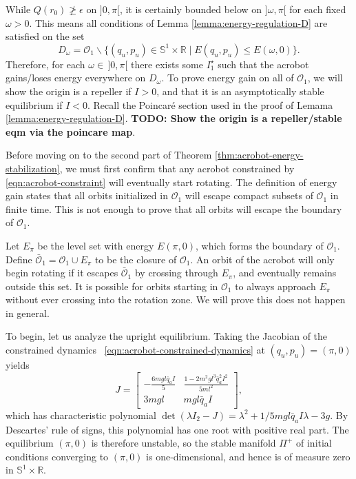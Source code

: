 \documentclass[journal,twoside,web]{ieeecolor}
\newcommand*{\R}{\mathbb{R}}
\newcommand*{\Sone}{\mathbb{S}^1}
\newcommand*{\SxR}{\Sone \times \R}
\newcommand*{\Id}[1]{I_{#1}}
\begin{document}
{While \(Q(r_0) \not \geq \epsilon\) on \(]0,\pi[\), it is certainly bounded
below on \(]\omega,\pi[\) for each fixed \(\omega > 0\).
This means all conditions of Lemma \ref{lemma:energy-regulation-D}
are satisfied on the set 
\[
    D_\omega = \mathcal{O}_1 \backslash 
    \{(q_u,p_u) \in \SxR \mid E(q_u,p_u) \leq E(\omega,0)\}
    .
\]
Therefore, for each \(\omega \in \, ]0,\pi[\) there exists some \(I_1^\star\)
such that the acrobot gains/loses energy everywhere on \(D_\omega\).
To prove energy gain on all of \(\mathcal{O}_1\), we will show the origin is a
repeller if \(I > 0\), and that it is an asymptotically stable equilibrium
if \(I < 0\).
Recall the Poincar\'{e} section used in the proof of Lemama
\ref{lemma:energy-regulation-D}.
\textbf{TODO: Show the origin is a repeller/stable eqm via the poincare map}.

Before moving on to the second part of Theorem
\ref{thm:acrobot-energy-stabilization}, we must first confirm that any acrobot
constrained by \eqref{eqn:acrobot-constraint} will eventually start rotating.
The definition of energy gain states that all orbits initialized in
\(\mathcal{O}_1\) will escape compact subsets of \(\mathcal{O}_1\) in finite time. 
This is not enough to prove that all orbits will escape the boundary of
\(\mathcal{O}_1\). 

Let \(E_\pi\) be the level set with energy \(E(\pi,0)\), 
which forms the boundary of \(\mathcal{O}_1\). 
Define \(\bar{\mathcal{O}}_1 = \mathcal{O}_1 \cup E_\pi\) to be the closure of
\(\mathcal{O}_1\).
An orbit of the acrobot will only begin rotating if it escapes
\(\bar{\mathcal{O}}_1\) by crossing through \(E_\pi\), and eventually remains
outside this set.
It is possible for orbits starting in \(\mathcal{O}_1\) to always approach
\(E_\pi\) without ever crossing into the rotation zone.
We will prove this does not happen in general.

To begin, let us analyze the upright equilibrium.
Taking the Jacobian of the constrained dynamics
~\eqref{eqn:acrobot-constrained-dynamics} at \((q_u,p_u) = (\pi,0)\) yields
\[
    J = \begin{bmatrix}
        -\frac{6mgl\bar{q}_aI}{5} & \frac{1 - 2m^2gl^3\bar{q}_a^2 I^2}{5ml^2} \\
        3mgl & mgl\bar{q}_aI
    \end{bmatrix}
    ,
\]
which has characteristic polynomial
\(\det\left(\lambda \Id{2} - J\right)
= \lambda^2 + 1/5 mgl\bar{q}_a I \lambda - 3g\).
By Descartes' rule of signs, this polynomial has one root with positive real
part. 
The equilibrium \((\pi,0)\) is therefore unstable, so the stable manifold \(\Pi^+\) of
initial conditions converging to \((\pi,0)\) is one-dimensional, and hence is
of measure zero in \(\SxR\).

}
\end{document}
